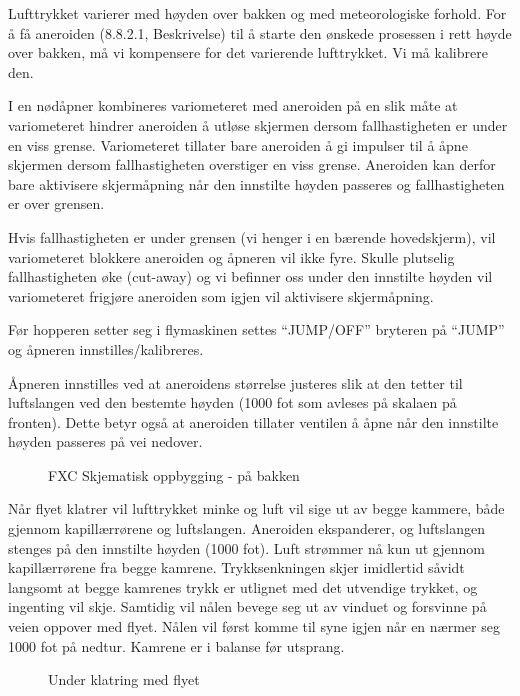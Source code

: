 Lufttrykket varierer med høyden over bakken og med meteorologiske forhold. For å få aneroiden (8.8.2.1, Beskrivelse) til å starte den ønskede prosessen i rett høyde over bakken, må vi kompensere for det varierende lufttrykket. Vi må kalibrere den.

I en nødåpner kombineres variometeret med aneroiden på en slik måte at variometeret hindrer aneroiden å utløse skjermen dersom fallhastigheten er under en viss grense. Variometeret tillater bare aneroiden å gi impulser til å åpne skjermen dersom fallhastigheten overstiger en viss grense. Aneroiden kan derfor bare aktivisere skjermåpning når den innstilte høyden passeres og fallhastigheten er over grensen.

Hvis fallhastigheten er under grensen (vi henger i en bærende hovedskjerm), vil variometeret blokkere aneroiden og åpneren vil ikke fyre. Skulle plutselig fallhastigheten øke (cut-away) og vi befinner oss under den innstilte høyden vil variometeret frigjøre aneroiden som igjen vil aktivisere skjermåpning.

Før hopperen setter seg i flymaskinen settes ``JUMP/OFF'' bryteren på ``JUMP'' og åpneren innstilles/kalibreres.

Åpneren innstilles ved at aneroidens størrelse justeres slik at den tetter til luftslangen ved den bestemte høyden (1000 fot som avleses på skalaen på fronten). Dette betyr også at aneroiden tillater ventilen å åpne når den innstilte høyden passeres på vei nedover.

\begin{figure}
	\caption{FXC Skjematisk oppbygging - på bakken}
\end{figure}

Når flyet klatrer vil lufttrykket minke og luft vil sige ut av begge kammere, både gjennom kapillærrørene og luftslangen. Aneroiden ekspanderer, og luftslangen stenges på den innstilte høyden (1000 fot). Luft strømmer nå kun ut gjennom kapillærrørene fra begge kamrene. Trykksenkningen skjer imidlertid såvidt langsomt at begge kamrenes trykk er utlignet med det utvendige trykket, og ingenting vil skje. Samtidig vil nålen bevege seg ut av vinduet og forsvinne på veien oppover med flyet. Nålen vil først komme til syne igjen når en nærmer seg 1000 fot på nedtur. Kamrene er i balanse før utsprang.

\begin{figure}
	\caption{Under klatring med flyet}
\end{figure}

